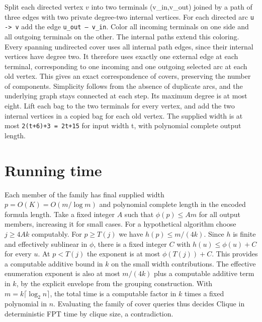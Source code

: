\documentclass[11pt]{article}
\begin{document}
Split each directed vertex \(v\) into two terminals (v\_in,v\_out) joined by a path of three edges with two private degree-two internal vertices. For each directed arc \texttt{u -> v} add the edge \texttt{u\_out -- v\_in}. Color all incoming terminals on one side and all outgoing terminals on the other. The internal paths extend this coloring. Every spanning undirected cover uses all internal path edges, since their internal vertices have degree two. It therefore uses exactly one external edge at each terminal, corresponding to one incoming and one outgoing selected arc at each old vertex. This gives an exact correspondence of covers, preserving the number of components. Simplicity follows from the absence of duplicate arcs, and the underlying graph stays connected at each step. Its maximum degree is at most eight. Lift each bag to the two terminals for every vertex, and add the two internal vertices in a copied bag for each old vertex. The supplied width is at most \texttt{2(t+6)+3 = 2t+15} for input width t, with polynomial complete output length.


\section{Running time}

Each member of the family has final supplied width
$p=O(K)=O(m/\log m)$ and polynomial complete length in the encoded
formula length. Take a fixed integer $A$ such that $\phi(p)\le Am$
for all output members, increasing it for small cases.
For a hypothetical algorithm choose $j\ge 4Ak$ computably.
For $p\ge T(j)$ we have $h(p)\le m/(4k)$.
Since $h$ is finite and effectively sublinear in $\phi$, there is
a fixed integer $C$ with $h(u)\le \phi(u)+C$ for every $u$.
At $p<T(j)$ the exponent is at most $\phi(T(j))+C$.
This provides a computable additive bound in $k$ on the small
width contributions. The effective enumeration exponent is
also at most $m/(4k)$ plus a computable additive term in $k$,
by the explicit envelope from the grouping construction.
With $m=k\lceil\log_2 n\rceil$, the total time is a computable
factor in $k$ times a fixed polynomial in $n$. Evaluating the
family of cover queries thus decides Clique in deterministic FPT
time by clique size, a contradiction.
\end{document}
